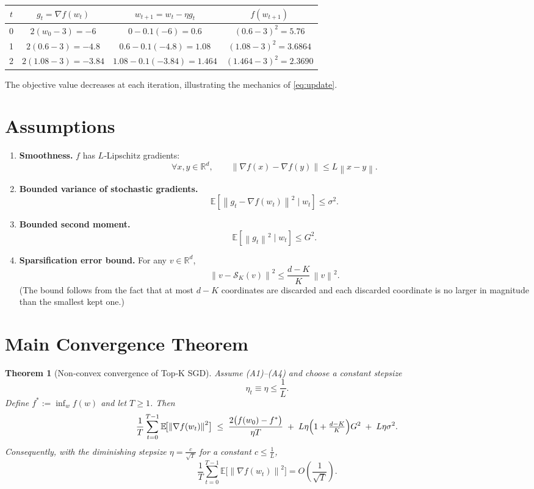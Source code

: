 \documentclass{article}
\newtheorem{theorem}{Theorem}
\newcommand{\E}{\mathbb{E}}
\newcommand{\R}{\mathbb{R}}
\newcommand{\norm}[1]{\left\|#1\right\|}
\newcommand{\topK}[2]{\mathcal{S}_{#1}(#2)}   %
\begin{document}
\begin{center}
\begin{tabular}{c|c|c|c}
$t$ & $g_{t}= \nabla f(w_{t})$ & $w_{t+1}=w_{t}-\eta g_{t}$ & $f(w_{t+1})$\\ \hline
0 & $2(w_{0}-3)=-6$ & $0-0.1(-6)=0.6$ & $(0.6-3)^{2}=5.76$\\
1 & $2(0.6-3)=-4.8$ & $0.6-0.1(-4.8)=1.08$ & $(1.08-3)^{2}=3.6864$\\
2 & $2(1.08-3)=-3.84$ & $1.08-0.1(-3.84)=1.464$ & $(1.464-3)^{2}=2.3690$
\end{tabular}
\end{center}
The objective value decreases at each iteration, illustrating the mechanics of \eqref{eq:update}.

\newpage

\section*{Assumptions}
\begin{enumerate}
\item \textbf{Smoothness.} $f$ has $L$‑Lipschitz gradients:
\[
\forall x,y\in\R^{d},\qquad 
\norm{\nabla f(x)-\nabla f(y)}\le L\norm{x-y}. \tag{A1}
\]
\item \textbf{Bounded variance of stochastic gradients.}
\[
\E\!\left[\norm{g_{t}-\nabla f(w_{t})}^{2}\mid w_{t}\right]\le\sigma^{2}. \tag{A2}
\]
\item \textbf{Bounded second moment.}
\[
\E\!\left[\norm{g_{t}}^{2}\mid w_{t}\right]\le G^{2}. \tag{A3}
\]
\item \textbf{Sparsification error bound.} For any $v\in\R^{d}$,
\[
\norm{v-\topK{K}{v}}^{2}\le \frac{d-K}{K}\,\norm{v}^{2}. \tag{A4}
\]
(The bound follows from the fact that at most $d-K$ coordinates are discarded and each discarded
coordinate is no larger in magnitude than the smallest kept one.)
\end{enumerate}

\section*{Main Convergence Theorem}
\begin{theorem}[Non‑convex convergence of Top‑K SGD]\label{thm:main}
Assume (A1)–(A4) and choose a constant stepsize
\[
\eta_{t}\equiv\eta\le \frac{1}{L}.
\]
Define $f^{*}:=\inf_{w}f(w)$ and let $T\ge1$. Then
\begin{equation}
\frac{1}{T}\sum_{t=0}^{T-1}\E\!\bigl[\norm{\nabla f(w_{t})}^{2}\bigr]
\;\le\;
\frac{2\bigl(f(w_{0})-f^{*}\bigr)}{\eta T}
\;+\;
L\eta\Bigl(1+\tfrac{d-K}{K}\Bigr) G^{2}
\;+\;
L\eta\sigma^{2}. \label{eq:rate}
\end{equation}
Consequently, with the diminishing stepsize $\eta=\frac{c}{\sqrt{T}}$ for a constant $c\le\frac{1}{L}$,
\[
\frac{1}{T}\sum_{t=0}^{T-1}\E\!\bigl[\norm{\nabla f(w_{t})}^{2}\bigr]
= O\!\left(\frac{1}{\sqrt{T}}\right).
\]
\end{theorem}
\end{document}
